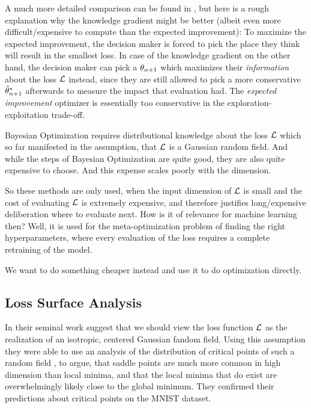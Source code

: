 A much more detailed comparison can be found in \cite{frazierBayesianOptimization2018},
but here is a rough explanation why the knowledge gradient might be better
(albeit even more difficult/expensive to compute than the expected improvement):
To maximize the expected improvement, the decision maker is forced to pick the
place they think will result in the smallest loss. In case of the knowledge
gradient on the other hand, the decision maker can pick a \(\theta_{n+1}\) which
maximizes their \emph{information} about the loss \(\mathcal{L}\) instead, since they
are still allowed to pick a more conservative \(\hat{\theta}^*_{n+1}\)
afterwards to measure the impact that evaluation had. The \emph{expected improvement}
optimizer is essentially too conservative in the exploration-exploitation trade-off. 

Bayesian Optimization requires distributional knowledge
about the loss \(\mathcal{L}\) which so far manifested in the assumption, that
\(\mathcal{L}\) is a Gaussian random field. And while the steps of Bayesian
Optimization are quite good, they are also quite expensive to choose. And this
expense scales poorly with the dimension.

So these methods are only used, when the input dimension of \(\mathcal{L}\) is small
and the cost of evaluating \(\mathcal{L}\) is extremely expensive, and therefore
justifies long/expensive deliberation where to evaluate next. How is it of
relevance for machine learning then? Well, it is used for the meta-optimization
problem of finding the right hyperparameters, where every evaluation of the loss
requires a complete retraining of the model.

We want to do something cheaper instead and use it to do optimization directly.

\subsection{Loss Surface Analysis}

In their seminal work 
\textcite{dauphinIdentifyingAttackingSaddle2014} suggest that we
should view the loss function \(\mathcal{L}\) as the realization of an isotropic,
centered Gaussian fandom field. Using this assumption they were able to use an
analysis of the distribution of critical points of such a random field
\parencite{brayStatisticsCriticalPoints2007}, to argue, that saddle points are
much more common in high dimension than local minima, and that the local minima
that do exist are overwhelmingly likely close to the global minimum. They
confirmed their predictions about critical points on the MNIST dataset.

